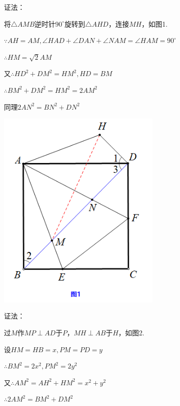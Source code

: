 {\kaishu\color{blue}
\begin{minipage}[h]{0.6\textwidth}
证法：
	
将$\triangle AMB$逆时针$90^\circ$旋转到$\triangle AHD$，连接$MH$，如图1.

$\because AH=AM,\angle HAD+\angle DAN+\angle NAM=\angle HAM=90^\circ$

$\therefore HM=\sqrt{2}AM$

又$\therefore HD^2+DM^2=HM^2,HD=BM$


$\therefore BM^2+DM^2=HM^2=2AM^2$

同理$2AN^2=BN^2+DN^2$	

\end{minipage}
\quad
\begin{minipage}[h]{0.4\textwidth}
	\centering
	\includegraphics[width=0.6\textwidth]{figure/banjiao14}
\end{minipage}

\begin{minipage}[h]{0.6\textwidth}
	证法：
	
过$M$作$MP \perp AD$于$P$，$MH \perp AB$于$H$，如图2.

设$HM=HB=x,PM=PD=y$

$\therefore BM^2=2x^2,PM^2=2y^2$

又$\therefore AM^2=AH^2+HM^2=x^2+y^2$

$\therefore 2AM^2=BM^2+DM^2$


\end{minipage}}
